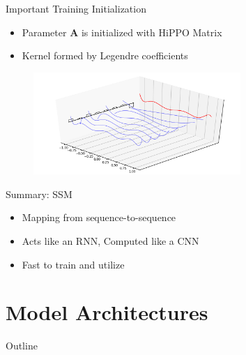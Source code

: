 \documentclass[14pt,aspectratio=169]{beamer}
\begin{document}
\begin{frame}{Important Training Initialization}
\begin{itemize}
\item Parameter $\boldsymbol{A}$ is initialized with  HiPPO Matrix \cite{gu2020hippo}



    \item Kernel formed by Legendre coefficients 
\end{itemize}
\begin{figure}
    \centering
    \includegraphics[width=0.7\textwidth]{Figs/hippo.png}
\end{figure}
\end{frame}



\begin{frame}{Summary: SSM}
    \begin{itemize}
        \item Mapping from sequence-to-sequence
        \item Acts like an RNN, Computed like a CNN
        \item Fast to train and utilize
    \end{itemize}
\end{frame}

\section{Model Architectures}
\begin{frame}{Outline}
    \tableofcontents[currentsection]
\end{frame}
\end{document}
